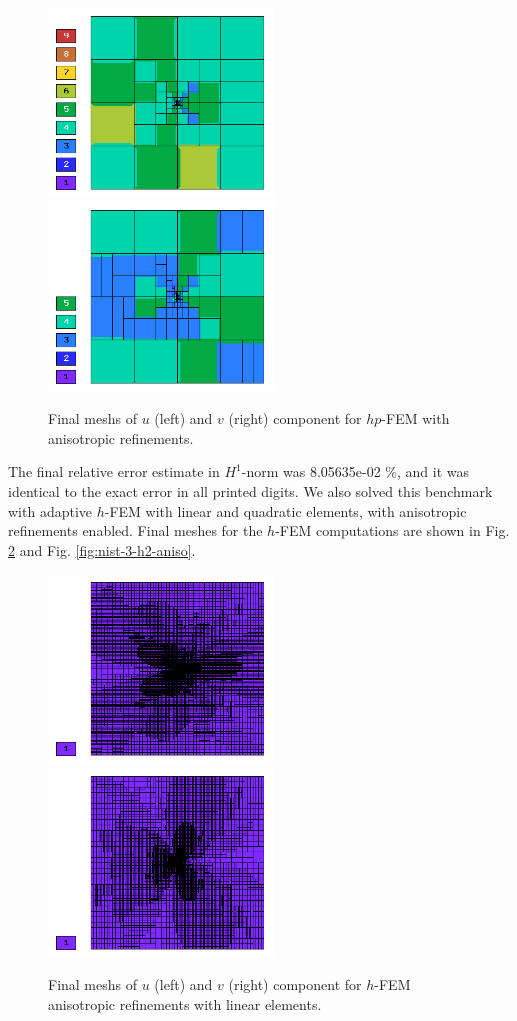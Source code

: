 \begin{figure}[!ht]
\centering
\includegraphics[height=5cm]{nist/nist-3/mesh_u_hp_anisoh.png}\ \
\includegraphics[height=5cm]{nist/nist-3/mesh_v_hp_anisoh.png}
\vspace{-2mm}
\caption{Final meshs of $u$ (left) and $v$ (right) component for $hp$-FEM with anisotropic refinements.}
\label{fig:nist-3-hp-aniso}
\end{figure}

The final relative error estimate in $H^1$-norm was 8.05635e-02 \%,
and it was identical to the exact error in all printed digits.
We also solved this benchmark with adaptive $h$-FEM
with linear and quadratic elements, with anisotropic refinements enabled.
Final meshes for the $h$-FEM computations are shown
in Fig. \ref{fig:nist-3-h1-aniso} and Fig. \ref{fig:nist-3-h2-aniso}.

\begin{figure}[!ht]
\centering
\includegraphics[height=5cm]{nist/nist-3/mesh_u_h1_aniso.png}\ \
\includegraphics[height=5cm]{nist/nist-3/mesh_v_h1_aniso.png}
\caption{Final meshs of $u$ (left) and $v$ (right) component for $h$-FEM anisotropic refinements with linear elements.}
\label{fig:nist-3-h1-aniso}
\end{figure}

